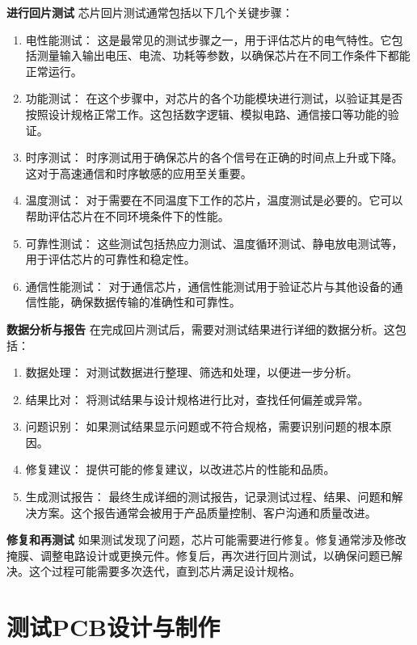 \textbf{进行回片测试}
芯片回片测试通常包括以下几个关键步骤：

\begin{enumerate}
\def\labelenumi{\arabic{enumi}.}
\tightlist
\item
  电性能测试： 这是最常见的测试步骤之一，用于评估芯片的电气特性。它包括测量输入输出电压、电流、功耗等参数，以确保芯片在不同工作条件下都能正常运行。
\item
  功能测试： 在这个步骤中，对芯片的各个功能模块进行测试，以验证其是否按照设计规格正常工作。这包括数字逻辑、模拟电路、通信接口等功能的验证。
\item
  时序测试： 时序测试用于确保芯片的各个信号在正确的时间点上升或下降。这对于高速通信和时序敏感的应用至关重要。
\item
  温度测试： 对于需要在不同温度下工作的芯片，温度测试是必要的。它可以帮助评估芯片在不同环境条件下的性能。
\item
  可靠性测试： 这些测试包括热应力测试、温度循环测试、静电放电测试等，用于评估芯片的可靠性和稳定性。
\item
  通信性能测试： 对于通信芯片，通信性能测试用于验证芯片与其他设备的通信性能，确保数据传输的准确性和可靠性。
\end{enumerate}

\textbf{数据分析与报告}
在完成回片测试后，需要对测试结果进行详细的数据分析。这包括：

\begin{enumerate}
\def\labelenumi{\arabic{enumi}.}
\tightlist
\item
  数据处理： 对测试数据进行整理、筛选和处理，以便进一步分析。
\item
  结果比对： 将测试结果与设计规格进行比对，查找任何偏差或异常。
\item
  问题识别： 如果测试结果显示问题或不符合规格，需要识别问题的根本原因。
\item
  修复建议： 提供可能的修复建议，以改进芯片的性能和品质。
\item
  生成测试报告： 最终生成详细的测试报告，记录测试过程、结果、问题和解决方案。这个报告通常会被用于产品质量控制、客户沟通和质量改进。
\end{enumerate}

\textbf{修复和再测试}
如果测试发现了问题，芯片可能需要进行修复。修复通常涉及修改掩膜、调整电路设计或更换元件。修复后，再次进行回片测试，以确保问题已解决。这个过程可能需要多次迭代，直到芯片满足设计规格。

\section{测试PCB设计与制作}\label{sec:18-test-and-show-004}

